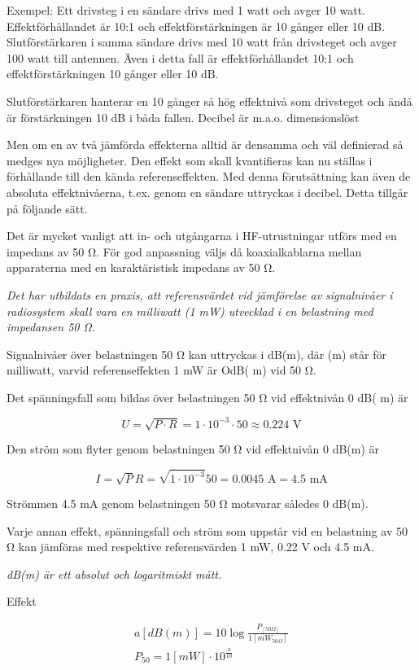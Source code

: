 Exempel: Ett drivsteg i en sändare drivs med 1 watt och avger 10
watt. Effektförhållandet är 10:1 och effektförstärkningen är 10 gånger
eller 10 dB. Slutförstärkaren i samma sändare drivs med 10 watt från
drivsteget och avger 100 watt till antennen. Även i detta fall är
effektförhållandet 10:1 och effektförstärkningen 10 gånger eller 10
dB.

Slutförstärkaren hanterar en 10 gånger så hög effektnivå som
drivsteget och ändå är förstärkningen 10 dB i båda fallen. Decibel är
m.a.o. dimensionslöst

Men om en av två jämförda effekterna alltid är densamma och väl
definierad så medges nya möjligheter. Den effekt som skall
kvantifieras kan nu ställas i förhållande till den kända
referenseffekten. Med denna förutsättning kan även de absoluta
effektnivåerna, t.ex. genom en sändare uttryckas i decibel. Detta
tillgår på följande sätt.

Det är mycket vanligt att in- och utgångarna i HF-utrustningar utförs
med en impedans av 50 Ω. För god anpassning väljs då koaxialkablarna
mellan apparaterna med en karaktäristisk impedans av 50 Ω.

\emph{Det har utbildats en praxis, att referensvärdet vid jämförelse
  av signalnivåer i radiosystem skall vara en milliwatt (1 mW)
  utvecklad i en belastning med impedansen 50 Ω.}

Signalnivåer över belastningen 50 Ω kan uttryckas i dB(m), där (m)
står för milliwatt, varvid referenseffekten 1 mW är OdB( m) vid 50 Ω.

Det spänningsfall som bildas över belastningen 50 Ω vid effektnivån 0
dB( m) är

\[U = \sqrt{P\cdot R} = 1\cdot 10^{-3} \cdot 50 \approx 0.224 \text{ V}\]

Den ström som flyter genom belastningen 50 Ω vid effektnivån 0 dB(m)
är

\[
I = \sqrt{P}{R} = \sqrt{1\cdot 10^{-3}}{50} = 0.0045 \text{ A} = 4.5 \text{ mA}
\]

Strömmen 4.5 mA genom belastningen 50 Ω motsvarar således 0 dB(m).

Varje annan effekt, spänningsfall och ström som uppstår vid en
belastning av 50 Ω kan jämföras med respektive referensvärden 1 mW,
0.22 V och 4.5 mA.

\emph{dB(m) är ett absolut och logaritmiskt mått.}

Effekt

\begin{gather*}
  a [dB(m)] = 10 \log\frac{P_{[50Ω]}}{1[mW_{50Ω}]} \\
  P_{50} = 1 [mW] \cdot 10^{\frac{a}{10}}
\end{gather*}

